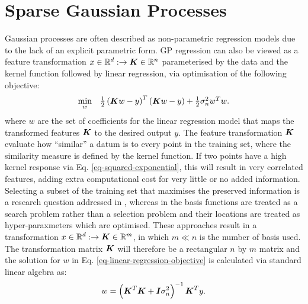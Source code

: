 \documentclass[useAMS,usenatbib,fleqn]{mn2e}
\begin{document}
\section{Sparse Gaussian Processes}
\label{sec-sparse-gaussian-processes}
Gaussian processes are often described as non-parametric regression models due to the lack of an explicit parametric form. GP regression can also be viewed as a feature transformation $x\in \mathbb{R}^{d}:\rightarrow \bmath{K}\in \mathbb{R}^{n}$ parameterised by the data and the kernel function followed by linear regression, via optimisation of the following objective:
\begin{equation}
\label{eq-linear-regression-objective}
\begin{array}{lcl}
\underset{w}{\text{min}} &\frac{1}{2}\left ( \bmath{K}w-y \right )^{T}\left( \bmath{K}w-y \right )+\frac{1}{2}\sigma_{n}^{2}w^{T}w.
\end{array}
\end{equation}
where $w$ are the set of coefficients for the linear regression model that maps the transformed features $\bmath{K}$ to the desired output $y$. The feature transformation $\bmath{K}$ evaluate how ``similar'' a datum is to every point in the training set, where the similarity measure is defined by the kernel function. If two points have a high kernel response via  Eq. \eqref{eq-squared-exponential}, this will result in very correlated features, adding extra computational cost for very little or no added information. Selecting a subset of the training set that maximises the preserved information is a research question addressed in \citep{foster2009}, whereas in \citep{snelson2005} the basis functions are treated as a search problem rather than a selection problem and their locations are treated as hyper-paraxmeters which are optimised. These approaches result in a transformation $x\in \mathbb{R}^{d}:\rightarrow \bmath{K}\in \mathbb{R}^{m}$, in which $m\ll n$ is the number of basis used. The transformation matrix $\bmath{K}$ will therefore be a rectangular $n$ by $m$ matrix and the solution for $w$ in  Eq. \eqref{eq-linear-regression-objective} is calculated via standard linear algebra as:
\begin{equation}
\label{eq-linear-regression-objective-rectangular}
w = \left(\bmath{K}^{T}\bmath{K}+\bmath{I}\sigma_{n}^{2} \right)^{-1}\bmath{K}^{T}y.
\end{equation}
\end{document}
